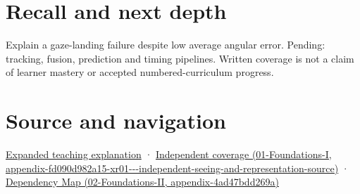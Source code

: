 \section{Recall and next depth}\label{appendix-a6f2c4fe1996-recall-and-next-depth}

Explain a gaze-landing failure despite low average angular error. Pending: tracking, fusion, prediction and timing pipelines. Written coverage is not a claim of learner mastery or accepted numbered-curriculum progress.

\section{Source and navigation}\label{appendix-a6f2c4fe1996-source-and-navigation}

\href{Continuous\%20Notes/University\%20-\%20Worlds,\%20Images\%20and\%20Inference\%20-\%20Graphics,\%20Vision\%20and\%20Photography\#A\%20gaze\%20sample\%20needs\%20a\%20time\%20as\%20well\%20as\%20a\%20direction}{Expanded teaching explanation} · \href{../01-Foundations-I/main.pdf\#nameddest=appendix-fd090d982a15-xr01---independent-seeing-and-representation-source}{Independent coverage (01-Foundations-I, appendix-fd090d982a15-xr01-\/-\/-independent-seeing-and-representation-source)} · \href{../02-Foundations-II/main.pdf\#nameddest=appendix-4ad47bdd269a}{Dependency Map (02-Foundations-II, appendix-4ad47bdd269a)}
